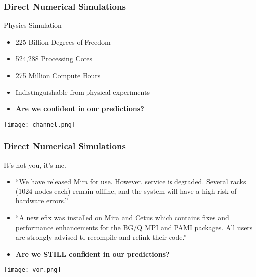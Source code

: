 \documentclass[mathserif]{beamer}
\begin{document}
\begin{frame}
  \frametitle{Direct Numerical Simulations}

      \begin{block}{Physics Simulation}
        \begin{itemize}
	 \item 225 Billion Degrees of Freedom
	 \item 524,288 Processing Cores
	 \item 275 Million Compute Hours
	 \item Indistinguishable from physical experiments

	 \item {\bf Are we confident in our predictions?}
        \end{itemize}
      \end{block}
 \begin{center}
  \center
  \texttt{[image: channel.png]}\\
 \end{center}
\end{frame}

\begin{frame}
  \frametitle{Direct Numerical Simulations}

      \begin{block}{It's not you, it's me.}
        \begin{itemize}
	 \item ``We have released Mira for use.  However, service is degraded. Several
	       racks (1024 nodes each) remain offline, and the system will have a high
	       risk of hardware errors.''
	 \item ``A new efix was installed on Mira and Cetus which contains
	       fixes and performance enhancements for the BG/Q MPI and
	       PAMI packages.  All users are strongly advised to
	       recompile and relink their code.''
	 \item {\bf Are we STILL confident in our predictions?}
        \end{itemize}
      \end{block}
 \begin{center}
  \center
  \texttt{[image: vor.png]}\\
 \end{center}
\end{frame}
\end{document}

